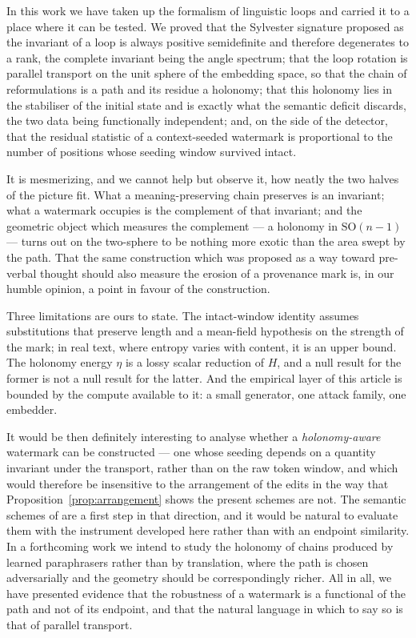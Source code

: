 \documentclass{article}
\theoremstyle{plain}
\theoremstyle{definition}
\numberwithin{equation}{section}
\newcommand{\SO}{\mathrm{SO}}
\begin{document}
In this work we have taken up the formalism of linguistic loops and
carried it to a place where it can be tested. We proved that the
Sylvester signature proposed as the invariant of a loop is always
positive semidefinite and therefore degenerates to a rank, the complete
invariant being the angle spectrum; that the loop rotation is parallel
transport on the unit sphere of the embedding space, so that the chain
of reformulations is a path and its residue a holonomy; that this
holonomy lies in the stabiliser of the initial state and is exactly what
the semantic deficit discards, the two data being functionally
independent; and, on the side of the detector, that the residual
statistic of a context-seeded watermark is proportional to the number of
positions whose seeding window survived intact.

It is mesmerizing, and we cannot help but observe it, how neatly the two
halves of the picture fit. What a meaning-preserving chain preserves is
an invariant; what a watermark occupies is the complement of that
invariant; and the geometric object which measures the complement --- a
holonomy in $\SO(n-1)$ --- turns out on the two-sphere to be nothing
more exotic than the area swept by the path. That the same construction
which was proposed as a way toward pre-verbal thought should also
measure the erosion of a provenance mark is, in our humble opinion, a
point in favour of the construction.

Three limitations are ours to state. The intact-window identity assumes
substitutions that preserve length and a mean-field hypothesis on the
strength of the mark; in real text, where entropy varies with content,
it is an upper bound. The holonomy energy $\eta$ is a lossy scalar
reduction of $H$, and a null result for the former is not a null result
for the latter. And the empirical layer of this article is bounded by
the compute available to it: a small generator, one attack family,
one embedder.

It would be then definitely interesting to analyse whether a
\emph{holonomy-aware} watermark can be constructed --- one whose seeding
depends on a quantity invariant under the transport, rather than on the
raw token window, and which would therefore be insensitive to the
arrangement of the edits in the way that Proposition~\ref{prop:arrangement}
shows the present schemes are not. The semantic schemes of
\cite{Hou24a} are a first step in that direction, and it would be
natural to evaluate them with the instrument developed here rather than
with an endpoint similarity. In a forthcoming work we intend to study
the holonomy of chains produced by learned paraphrasers rather than by
translation, where the path is chosen adversarially and the geometry
should be correspondingly richer. All in all, we have presented evidence
that the robustness of a watermark is a functional of the path and not
of its endpoint, and that the natural language in which to say so is
that of parallel transport.
\end{document}
